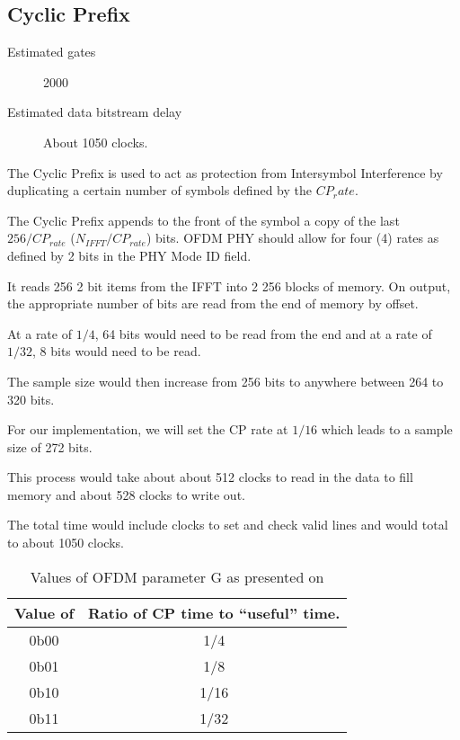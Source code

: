 

\subsection{Cyclic Prefix}
\label{sec:cyclic_prefix}
\begin{description}
	\item[Estimated gates] 2000
	\item[Estimated data bitstream delay] About 1050 clocks.
\end{description}

The Cyclic Prefix is used to act as protection from Intersymbol Interference 
by duplicating a certain number of symbols defined by the $CP_rate$.

The Cyclic Prefix appends to the front of the symbol a copy of the last
$256/CP_{rate}$ ($N_{IFFT}/CP_{rate}$) bits. OFDM PHY should allow for four
(4) rates as defined by 2 bits in the PHY Mode ID field. 

It reads 256 2 bit items from the IFFT into 2 256 blocks of memory.
On output, the appropriate number of bits are read from the end of 
memory by offset.

At a rate of $1/4$, 64 bits would need to be read from the end and 
at a rate of $1/32$, 8 bits would need to be read.

The sample size would then increase from 256 bits to anywhere between
264 to 320 bits.

For our implementation, we will set the CP rate at $1/16$ which leads to
a sample size of 272 bits.

This process would take about about 512 clocks to read in the data to fill
memory and about 528 clocks to write out. 

The total time would include clocks to set and check valid lines and would
total to about 1050 clocks. 

\begin{table}
	\begin{tabulary}{\linewidth}{C|C}
		Value of  & Ratio of CP time to ``useful'' time. \\ \hline

		0b00 & 1/4 \\
		0b01 & 1/8 \\
		0b10 & 1/16 \\
		0b11 & 1/32

	\end{tabulary}
	\caption{Values of OFDM parameter G as presented on }
	\label{tbl:param-g-vals}

\end{table}

